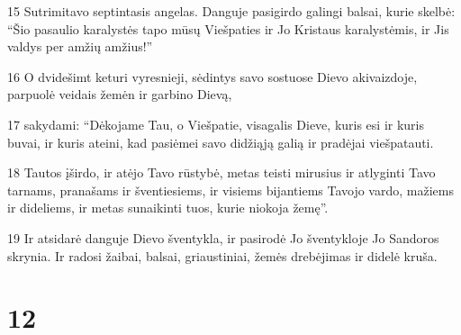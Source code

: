 \par 15 Sutrimitavo septintasis angelas. Danguje pasigirdo galingi balsai, kurie skelbė: “Šio pasaulio karalystės tapo mūsų Viešpaties ir Jo Kristaus karalystėmis, ir Jis valdys per amžių amžius!” 
\par 16 O dvidešimt keturi vyresnieji, sėdintys savo sostuose Dievo akivaizdoje, parpuolė veidais žemėn ir garbino Dievą, 
\par 17 sakydami: “Dėkojame Tau, o Viešpatie, visagalis Dieve, kuris esi ir kuris buvai, ir kuris ateini, kad pasiėmei savo didžiąją galią ir pradėjai viešpatauti. 
\par 18 Tautos įširdo, ir atėjo Tavo rūstybė, metas teisti mirusius ir atlyginti Tavo tarnams, pranašams ir šventiesiems, ir visiems bijantiems Tavojo vardo, mažiems ir dideliems, ir metas sunaikinti tuos, kurie niokoja žemę”. 
\par 19 Ir atsidarė danguje Dievo šventykla, ir pasirodė Jo šventykloje Jo Sandoros skrynia. Ir radosi žaibai, balsai, griaustiniai, žemės drebėjimas ir didelė kruša.


\chapter{12}


